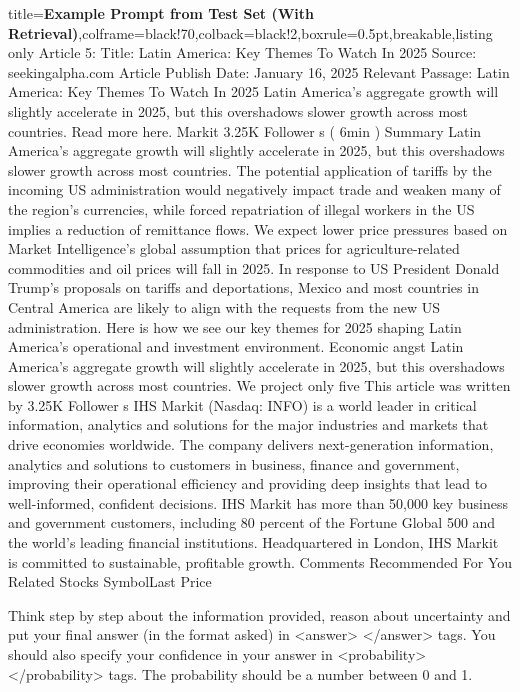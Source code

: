 \begin{tcblisting}{title={\textbf{Example Prompt from Test Set (With Retrieval)}},colframe=black!70,colback=black!2,boxrule=0.5pt,breakable,listing only}
Article 5:
Title: Latin America: Key Themes To Watch In 2025
Source: seekingalpha.com
Article Publish Date: January 16, 2025
Relevant Passage: Latin America: Key Themes To Watch In 2025 Latin America's aggregate growth will slightly accelerate in 2025, but this overshadows slower growth across most countries. Read more here. Markit 3.25K Follower s ( 6min ) Summary Latin America's aggregate growth will slightly accelerate in 2025, but this overshadows slower growth across most countries. The potential application of tariffs by the incoming US administration would negatively impact trade and weaken many of the region's currencies, while forced repatriation of illegal workers in the US implies a reduction of remittance flows. We expect lower price pressures based on Market Intelligence's global assumption that prices for agriculture-related commodities and oil prices will fall in 2025. In response to US President Donald Trump's proposals on tariffs and deportations, Mexico and most countries in Central America are likely to align with the requests from the new US administration. Here is how we see our key themes for 2025 shaping Latin America's operational and investment environment. Economic angst Latin America's aggregate growth will slightly accelerate in 2025, but this overshadows slower growth across most countries. We project only five This article was written by 3.25K Follower s IHS Markit (Nasdaq: INFO) is a world leader in critical information, analytics and solutions for the major industries and markets that drive economies worldwide. The company delivers next-generation information, analytics and solutions to customers in business, finance and government, improving their operational efficiency and providing deep insights that lead to well-informed, confident decisions. IHS Markit has more than 50,000 key business and government customers, including 80 percent of the Fortune Global 500 and the world's leading financial institutions. Headquartered in London, IHS Markit is committed to sustainable, profitable growth. Comments Recommended For You Related Stocks SymbolLast Price%

Think step by step about the information provided, reason about uncertainty and put your final answer (in the format asked) in <answer> </answer> tags.
You should also specify your confidence in your answer in <probability> </probability> tags.
The probability should be a number between 0 and 1.


\end{tcblisting}
